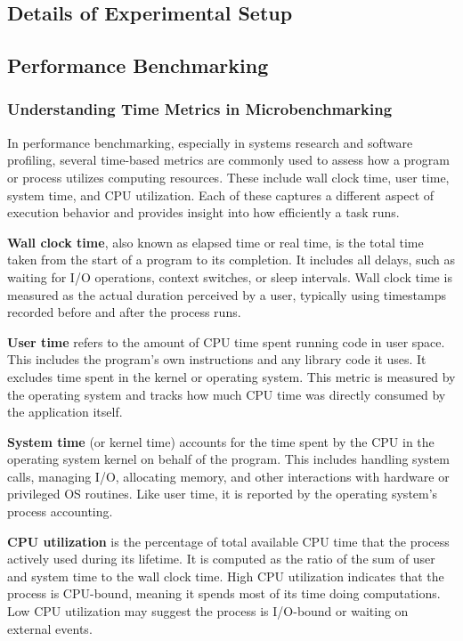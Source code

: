 \documentclass[12pt]{report}
\begin{document}
\begin{doublespace}
\appendix
\chapter{Details of Experimental Setup}

\section{Performance Benchmarking}

\subsection{Understanding Time Metrics in Microbenchmarking}

In performance benchmarking, especially in systems research and software profiling, several time-based metrics are commonly used to assess how a program or process utilizes computing resources. These include wall clock time, user time, system time, and CPU utilization. Each of these captures a different aspect of execution behavior and provides insight into how efficiently a task runs.

\textbf{Wall clock time}, also known as elapsed time or real time, is the total time taken from the start of a program to its completion. It includes all delays, such as waiting for I/O operations, context switches, or sleep intervals. Wall clock time is measured as the actual duration perceived by a user, typically using timestamps recorded before and after the process runs.

\textbf{User time} refers to the amount of CPU time spent running code in user space. This includes the program’s own instructions and any library code it uses. It excludes time spent in the kernel or operating system. This metric is measured by the operating system and tracks how much CPU time was directly consumed by the application itself.

\textbf{System time} (or kernel time) accounts for the time spent by the CPU in the operating system kernel on behalf of the program. This includes handling system calls, managing I/O, allocating memory, and other interactions with hardware or privileged OS routines. Like user time, it is reported by the operating system’s process accounting.

\textbf{CPU utilization} is the percentage of total available CPU time that the process actively used during its lifetime. It is computed as the ratio of the sum of user and system time to the wall clock time. High CPU utilization indicates that the process is CPU-bound, meaning it spends most of its time doing computations. Low CPU utilization may suggest the process is I/O-bound or waiting on external events.


\end{doublespace}
\end{document}
